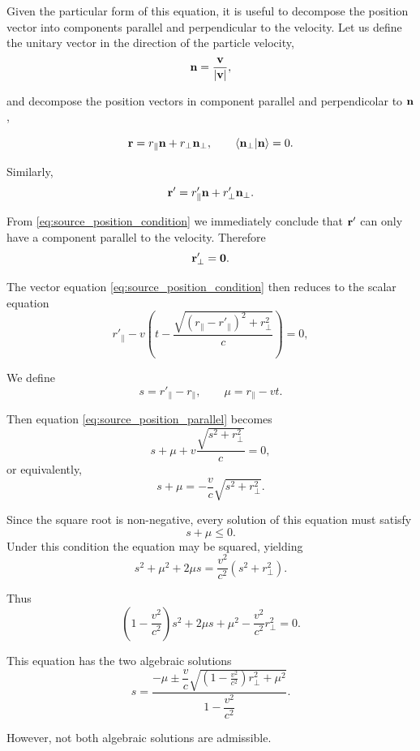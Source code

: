\documentclass[12pt]{article}
\begin{document}
Given the particular form of this equation, it is useful to decompose the position vector into components parallel and
perpendicular to the velocity. Let us define the unitary vector in the direction of the particle velocity,
\[
  \vb{n}
  =
  \frac{\vb{v}}{\abs{\vb{v}}},
\]

and decompose the position vectors in component parallel and perpendicolar to $\vb n$,

\[
  \vb{r}
  =
  r_\parallel \vb{n}
  +
  r_\perp \vb{n}_\perp,
  \qquad
  \ip{\vb{n}_\perp}{\vb{n}}=0.
\]

Similarly,
\[
  \vb{r}'
  =
  r'_\parallel \vb{n}
  +
  r'_\perp\vb{n}_\perp.
\]

From \eqref{eq:source_position_condition} we immediately conclude that
$\vb r'$ can only have a component parallel to the velocity. Therefore
\[
  \vb r'_\perp=\vb0.
\]

The vector equation \eqref{eq:source_position_condition} then reduces to the
scalar equation
\begin{equation}
  r'_\parallel
  -
  v
  \left(
    t
    -
    \frac{
      \sqrt{(r_\parallel-r'_\parallel)^2+r_\perp^2}
    }{c}
  \right)
  =
  0,
  \label{eq:source_position_parallel}
\end{equation}

We define
\[
  s=r'_\parallel-r_\parallel,
  \qquad
  \mu=r_\parallel-vt.
\]

Then equation \eqref{eq:source_position_parallel} becomes
\[
  s+\mu
  +
  v
  \frac{
    \sqrt{s^2+r_\perp^2}
  }{c}
  =
  0,
\]
or equivalently,
\[
  s+\mu
  =
  -
  \frac{v}{c}
  \sqrt{s^2+r_\perp^2}.
\]

Since the square root is non-negative, every solution of this equation must satisfy
\[
  s+\mu\le0.
\]
Under this condition the equation may be squared, yielding
\[
  s^2+\mu^2+2\mu s
  =
  \frac{v^2}{c^2}
  \left(
    s^2+r_\perp^2
  \right).
\]

Thus
\[
  \left(
    1-\frac{v^2}{c^2}
  \right)s^2
  +
  2\mu s
  +
  \mu^2
  -
  \frac{v^2}{c^2}r_\perp^2
  =
  0.
\]

This equation has the two algebraic solutions
\begin{equation}
  s
  =
  \frac{
    -\mu
    \pm
    \dfrac{v}{c}
    \sqrt{
      \left(
        1-\frac{v^2}{c^2}
      \right)r_\perp^2
      +
      \mu^2
    }
  }{
    1-\dfrac{v^2}{c^2}
  }.
  \label{eq:s_algebraic_solutions}
\end{equation}

However, not both algebraic solutions are admissible.
\end{document}
